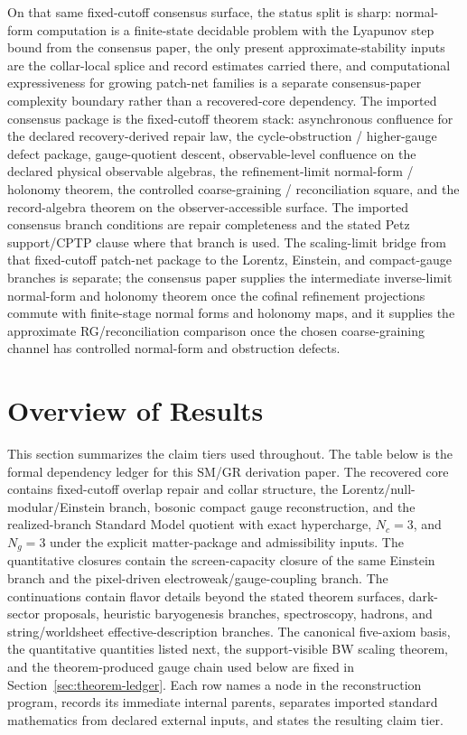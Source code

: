 \documentclass[11pt]{article}
\begin{document}
On that same fixed-cutoff consensus surface, the status split is sharp: normal-form computation is
a finite-state decidable problem with the Lyapunov step bound from the consensus paper, the only
present approximate-stability inputs are the collar-local splice and record estimates carried
there, and computational expressiveness for growing patch-net families is a separate consensus-paper
complexity boundary rather than a recovered-core dependency.
The imported consensus package is the fixed-cutoff theorem stack: asynchronous confluence
for the declared recovery-derived repair law, the cycle-obstruction / higher-gauge defect package,
gauge-quotient descent, observable-level confluence on the declared physical observable algebras,
the refinement-limit normal-form / holonomy theorem, the controlled coarse-graining /
reconciliation square, and the record-algebra theorem on the observer-accessible surface. The imported consensus
branch conditions are repair completeness and the stated Petz support/CPTP clause where that branch is used.
The scaling-limit bridge from that fixed-cutoff patch-net package to the Lorentz, Einstein, and
compact-gauge branches is separate; the consensus paper supplies the intermediate inverse-limit
normal-form and holonomy theorem once the cofinal refinement projections commute with finite-stage
normal forms and holonomy maps, and it supplies the approximate RG/reconciliation comparison once
the chosen coarse-graining channel has controlled normal-form and obstruction defects.

\section{Overview of Results}

This section summarizes the claim tiers used throughout. The table below is the formal dependency
ledger for this SM/GR derivation paper. The recovered core contains fixed-cutoff overlap repair and
collar structure, the Lorentz/null-modular/Einstein branch, bosonic compact gauge reconstruction,
and the realized-branch Standard Model quotient with exact hypercharge, \(N_c=3\), and \(N_g=3\)
under the explicit matter-package and admissibility inputs. The quantitative closures contain the
screen-capacity closure of the same Einstein branch and the pixel-driven electroweak/gauge-coupling
branch. The continuations contain flavor details beyond the stated theorem surfaces, dark-sector
proposals, heuristic baryogenesis branches, spectroscopy, hadrons, and string/worldsheet
effective-description branches. The canonical five-axiom basis, the quantitative quantities listed
next, the support-visible BW scaling theorem, and the theorem-produced gauge chain used below are
fixed in Section~\ref{sec:theorem-ledger}. Each row names a node in the reconstruction program,
records its immediate internal parents, separates imported standard mathematics from declared
external inputs, and states the resulting claim tier.
\end{document}
